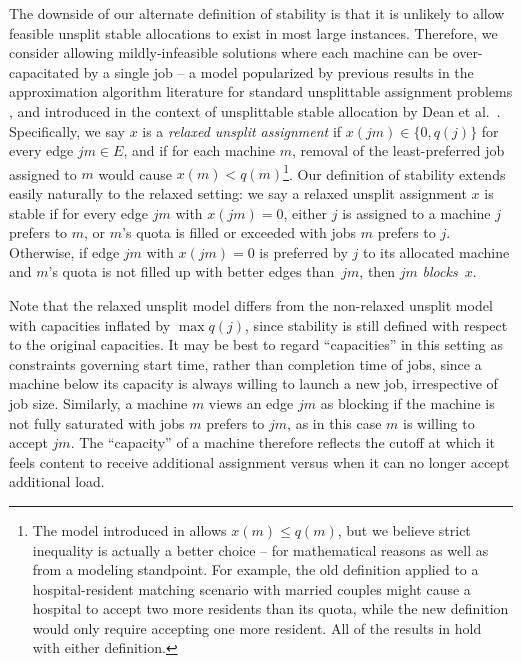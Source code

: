 \documentclass{llncs}
\begin{document}
  The downside of our
alternate definition of stability is that it is unlikely to allow
feasible unsplit stable allocations to exist in most large instances.
Therefore, we consider allowing mildly-infeasible solutions where each
machine can be over-capacitated by a single job -- a model popularized
by previous results in the approximation algorithm literature for
standard unsplittable assignment problems
\cite{DinitzGG99,Skutella00,ShmoysT93}, and introduced in the context
of unsplittable stable allocation by Dean et al.~\cite{dean_unsplit}.
Specifically, we say $x$ is a \emph{relaxed unsplit assignment} if
$x(jm) \in \{0,q(j)\}$ for every edge $jm \in E$, and if for each
machine $m$, removal of the least-preferred job assigned to $m$ would
cause $x(m) < q(m)$\footnote{The model introduced in
  \cite{dean_unsplit} allows $x(m) \leq q(m)$, but we believe strict
  inequality is actually a better choice -- for mathematical reasons
  as well as from a modeling standpoint.  For example, the old
  definition applied to a hospital-resident matching scenario with
  married couples might cause a hospital to accept two more residents
  than its quota, while the new definition would only require
  accepting one more resident.  All of the
  results in \cite{dean_unsplit} hold with either definition.}.  Our
definition of stability extends easily naturally to the relaxed
setting: we say a relaxed unsplit assignment $x$ is stable if for
every edge $jm$ with $x(jm)=0$, either $j$ is assigned to a machine
$j$ prefers to $m$, or $m$'s quota is filled or exceeded with jobs $m$
prefers to $j$.  Otherwise, if edge $jm$ with $x(jm) = 0$ is preferred
by $j$ to its allocated machine and $m$'s quota is not filled up with
better edges than~$jm$, then $jm$ \emph{blocks}~$x$.

Note that the relaxed unsplit model differs from the non-relaxed
unsplit model with capacities inflated by $\max q(j)$, since stability
is still defined with respect to the original capacities.  It may be
best to regard ``capacities'' in this setting as constraints governing
start time, rather than completion time of jobs, since a machine below
its capacity is always willing to launch a new job, irrespective of
job size.  Similarly, a machine $m$ views an edge $jm$ as blocking if
the machine is not fully saturated with jobs $m$ prefers to $jm$, as
in this case $m$ is willing to accept $jm$.  The ``capacity'' of a
machine therefore reflects the cutoff at which it feels content to
receive additional assignment versus when it can no longer accept
additional load.
\end{document}
